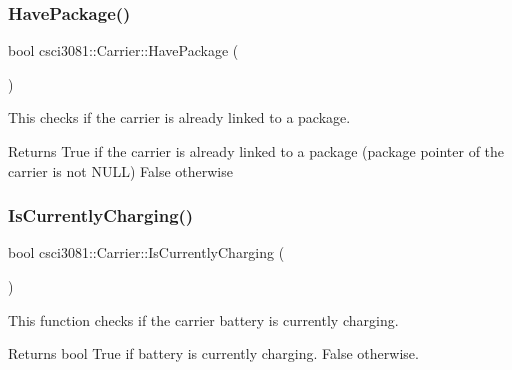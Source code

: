 \mbox{\label{classcsci3081_1_1Carrier_a5f20ff445085ba10866ff83dc3d2ea93}} 
\subsubsection{\texorpdfstring{Have\+Package()}{HavePackage()}}
{\footnotesize\ttfamily bool csci3081\+::\+Carrier\+::\+Have\+Package (\begin{DoxyParamCaption}{ }\end{DoxyParamCaption})}



This checks if the carrier is already linked to a package. 

\begin{DoxyReturn}{Returns}
True if the carrier is already linked to a package (package pointer of the carrier is not N\+U\+LL) False otherwise 
\end{DoxyReturn}
\mbox{\label{classcsci3081_1_1Carrier_ac126252e1b6bf129d4369b299851211d}} 
\subsubsection{\texorpdfstring{Is\+Currently\+Charging()}{IsCurrentlyCharging()}}
{\footnotesize\ttfamily bool csci3081\+::\+Carrier\+::\+Is\+Currently\+Charging (\begin{DoxyParamCaption}{ }\end{DoxyParamCaption})}



This function checks if the carrier battery is currently charging. 

\begin{DoxyReturn}{Returns}
bool True if battery is currently charging. False otherwise. 
\end{DoxyReturn}
\mbox{\label{classcsci3081_1_1Carrier_a10382f16402af20f4bc03eaad5eb9e30}} 
